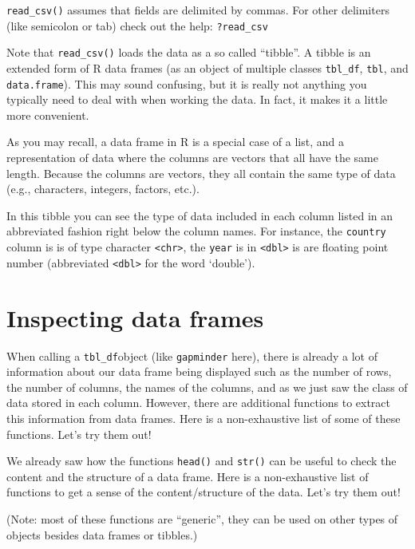 \documentclass[
]{book}
\begin{document}
\texttt{read\_csv()} assumes that fields are delimited by commas. For other delimiters (like semicolon or tab) check out the help: \texttt{?read\_csv}

Note that \texttt{read\_csv()} loads the data as a so called ``tibble''. A tibble is an extended form of R data frames (as an object of multiple classes \texttt{tbl\_df}, \texttt{tbl}, and \texttt{data.frame}). This may sound confusing, but it is really not anything you typically need to deal with when working the data. In fact, it makes it a little more convenient.

As you may recall, a data frame in R is a special case of a list, and a representation of data where the columns are vectors that all have the same length. Because the columns are vectors, they all contain the same type of data (e.g., characters, integers, factors, etc.).

In this tibble you can see the type of data included in each column listed in an abbreviated fashion right below the column names. For instance, the \texttt{country} column is is of type character \texttt{\textless{}chr\textgreater{}}, the \texttt{year} is in \texttt{\textless{}dbl\textgreater{}} is are floating point number (abbreviated \texttt{\textless{}dbl\textgreater{}} for the word `double').

\section{Inspecting data frames}\label{inspecting-data-frames-1}

When calling a \texttt{tbl\_df}object (like \texttt{gapminder} here), there is already a lot of information about our data frame being displayed such as the number of rows, the number of columns, the names of the columns, and as we just saw the class of data stored in each column. However, there are additional functions to extract this information from data frames. Here is a non-exhaustive list of some of these functions. Let's try them out!

We already saw how the functions \texttt{head()} and \texttt{str()} can be useful to check the
content and the structure of a data frame. Here is a non-exhaustive list of
functions to get a sense of the content/structure of the data. Let's try them out!

(Note: most of these functions are ``generic'', they can be used on other types of
objects besides data frames or tibbles.)
\end{document}
